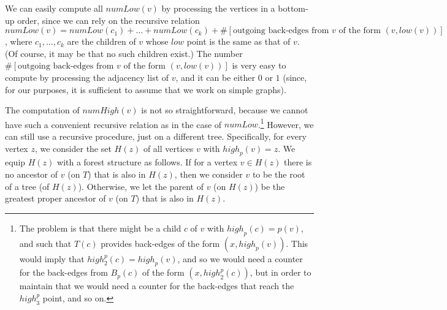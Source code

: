 \documentclass[11pt,a4paper]{article}
\begin{document}
We can easily compute all $\mathit{numLow}(v)$ by processing the vertices in a bottom-up order, since we can rely on the recursive relation $\mathit{numLow}(v)=\mathit{numLow}(c_1)+\dots+\mathit{numLow}(c_k)+\#[\mbox{outgoing back-edges from }v\mbox{ of the form }(v,\mathit{low}(v))]$, where $c_1,\dots,c_k$ are the children of $v$ whose $\mathit{low}$ point is the same as that of $v$. (Of course, it may be that no such children exist.) The number $\#[\mbox{outgoing back-edges from }v\mbox{ of the form }(v,\mathit{low}(v))]$ is very easy to compute by processing the adjacency list of $v$, and it can be either $0$ or $1$ (since, for our purposes, it is sufficient to assume that we work on simple graphs).

The computation of $\mathit{numHigh}(v)$ is not so straightforward, because we cannot have such a convenient recursive relation as in the case of $\mathit{numLow}$.\footnote{The problem is that there might be a child $c$ of $v$ with $\mathit{high}_p(c)=p(v)$, and such that $T(c)$ provides back-edges of the form $(x,\mathit{high}_p(v))$. This would imply that $\mathit{high}^p_2(c)=\mathit{high}_p(v)$, and so we would need a counter for the back-edges from $B_p(c)$ of the form $(x,\mathit{high}^p_2(c))$, but in order to maintain that we would need a counter for the back-edges that reach the $\mathit{high}^p_3$ point, and so on.} However, we can still use a recursive procedure, just on a different tree. Specifically, for every vertex $z$, we consider the set $H(z)$ of all vertices $v$ with $\mathit{high}_p(v)=z$. We equip $H(z)$ with a forest structure as follows. If for a vertex $v\in H(z)$ there is no ancestor of $v$ (on $T$) that is also in $H(z)$, then we consider $v$ to be the root of a tree (of $H(z)$). Otherwise, we let the parent of $v$ (on $H(z)$) be the greatest proper ancestor of $v$ (on $T$) that is also in $H(z)$. 
\end{document}

